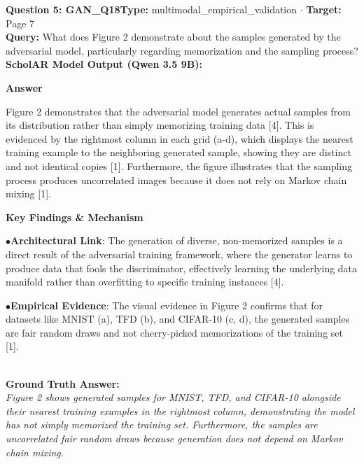 \documentclass[10pt,a4paper]{article}
\begin{document}
\begin{tcolorbox}[questionbox]
{\noindent\bfseries\large\color{navy} Question 5: GAN\_Q18}\hfill {\footnotesize\color{darkteal}\textbf{Type:} multimodal\_empirical\_validation $\cdot$ \textbf{Target:} Page 7}\\[4pt]
{\noindent\bfseries\color{accentblue} Query: } What does Figure 2 demonstrate about the samples generated by the adversarial model, particularly regarding memorization and the sampling process?\\[6pt]
{\noindent\bfseries\color{navy} ScholAR Model Output (Qwen 3.5 9B):}\\[2pt]
{\small \noindent \textbf{Answer}\par\vspace{3pt}Figure 2 demonstrates that the adversarial model generates actual samples from its distribution rather than simply memorizing training data [4]. This is evidenced by the rightmost column in each grid (a-d), which displays the nearest training example to the neighboring generated sample, showing they are distinct and not identical copies [1]. Furthermore, the figure illustrates that the sampling process produces uncorrelated images because it does not rely on Markov chain mixing [1].\par\vspace{3pt}\noindent \textbf{Key Findings \& Mechanism}\par\vspace{3pt}\noindent\hspace*{8pt}$\bullet$\hspace*{4pt}\textbf{Architectural Link}: The generation of diverse, non-memorized samples is a direct result of the adversarial training framework, where the generator learns to produce data that fools the discriminator, effectively learning the underlying data manifold rather than overfitting to specific training instances [4].\par\vspace{3pt}\noindent\hspace*{8pt}$\bullet$\hspace*{4pt}\textbf{Empirical Evidence}: The visual evidence in Figure 2 confirms that for datasets like MNIST (a), TFD (b), and CIFAR-10 (c, d), the generated samples are fair random draws and not cherry-picked memorizations of the training set [1].}\\[6pt]
{\noindent\bfseries\color{darkteal} Ground Truth Answer:}\\[2pt]
{\small\itshape Figure 2 shows generated samples for MNIST, TFD, and CIFAR-10 alongside their nearest training examples in the rightmost column, demonstrating the model has not simply memorized the training set. Furthermore, the samples are uncorrelated fair random draws because generation does not depend on Markov chain mixing.}\\[4pt]

\end{tcolorbox}
\end{document}
